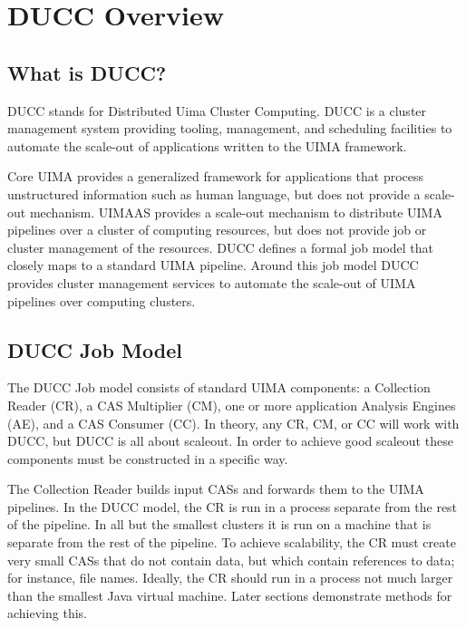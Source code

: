 \chapter{DUCC Overview}

    \section{What is DUCC?}

    DUCC stands for Distributed Uima Cluster Computing. DUCC is a cluster management system
    providing tooling, management, and scheduling facilities to automate the scale-out of
    applications written to the UIMA framework.

    Core UIMA provides a generalized framework for applications that process unstructured
    information such as human language, but does not provide a scale-out mechanism. UIMAAS provides
    a scale-out mechanism to distribute UIMA pipelines over a cluster of computing resources, but
    does not provide job or cluster management of the resources. DUCC defines a formal job model
    that closely maps to a standard UIMA pipeline. Around this job model DUCC provides cluster
    management services to automate the scale-out of UIMA pipelines over computing clusters.

    \section{DUCC Job Model}

    The DUCC Job model consists of standard UIMA components: a Collection Reader (CR), a CAS Multiplier
    (CM), one or more application Analysis Engines (AE), and a CAS Consumer (CC).  In theory, any
    CR, CM, or CC will work with DUCC, but DUCC is all about scaleout.  In order to achieve good
    scaleout these components must be constructed in a specific way.

    The Collection Reader builds input CASs and forwards them to the UIMA pipelines.  In the DUCC
    model, the CR is run in a process separate from the rest of the pipeline. In all but the smallest
    clusters it is run on a machine that is separate from the rest of the pipeline.  To achieve
    scalability, the CR must create very small CASs that do not contain data, but which contain
    references to data; for instance, file names.  Ideally, the CR should run in a process not much
    larger than the smallest Java virtual machine.  Later sections demonstrate methods for 
    achieving this.

